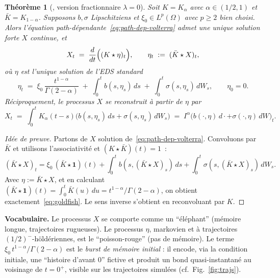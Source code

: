 \documentclass[11pt,a4paper]{article}
\newtheorem{theorem}{Théorème}[section]
\theoremstyle{definition}
\newcommand{\1}{\mathbf{1}}
\begin{document}
\begin{theorem}[{\cite[Thm 3.4]{BCGP23}}, version fractionnaire $\lambda=0$]
\label{thm:bridge}
Soit $K = K_\alpha$ avec $\alpha\in(1/2,1)$ et $\bar K = K_{1-\alpha}$. Supposons
$b,\sigma$ Lipschitziens et $\xi_0\in L^p(\Omega)$ avec $p\geq 2$ bien choisi.
Alors l'équation path-dépendante~\eqref{eq:path-dep-volterra} admet une unique
solution forte $X$ continue, et
\[
X_t \;=\; \frac{d}{dt}\Bigl((K\star \eta)_t\Bigr),\qquad
\eta_t \;:=\; (\bar K \star X)_t,
\]
où $\eta$ est l'unique solution de l'EDS \emph{standard}
\begin{equation}
\boxed{~~\eta_t \;=\; \xi_0\,\frac{t^{1-\alpha}}{\Gamma(2-\alpha)}
       \;+\; \int_0^t b(s,\eta_s)\, ds
       \;+\; \int_0^t \sigma(s,\eta_s)\, dW_s, \qquad \eta_0 = 0.~~}
\label{eq:goldfish}
\end{equation}
Réciproquement, le processus $X$ se reconstruit à partir de $\eta$ par
\begin{equation}
X_t \;=\; \int_0^t K_\alpha(t-s)\bigl(b(s,\eta_s)\,ds + \sigma(s,\eta_s)\,dW_s\bigr)
      \;=\; I^\alpha\bigl(b(\cdot,\eta)\,d\cdot + \sigma(\cdot,\eta)\,dW\bigr)_t.
\label{eq:elephant-recon}
\end{equation}
\end{theorem}

\begin{proof}[Idée de preuve]
Partons de $X$ solution de~\eqref{eq:path-dep-volterra}. Convoluons par $\bar K$
et utilisons l'associativité et $(K\star\bar K)(t)=1$~:
\[
(\bar K \star X)_t = \xi_0\,(\bar K\star \1)(t) + \int_0^t b(s,(\bar K\star X)_s)\,ds
                     + \int_0^t \sigma(s,(\bar K\star X)_s)\,dW_s.
\]
Avec $\eta := \bar K\star X$, et en calculant $(\bar K\star\1)(t) = \int_0^t
\bar K(u)\, du = t^{1-\alpha}/\Gamma(2-\alpha)$, on obtient
exactement~\eqref{eq:goldfish}. Le sens inverse s'obtient en reconvoluant par
$K$.
\end{proof}

\noindent\textbf{Vocabulaire.} Le processus $X$ se comporte comme un
\enquote{éléphant} (mémoire longue, trajectoires rugueuses). Le processus $\eta$,
markovien et à trajectoires $(1/2)^-$-höldériennes, est le \enquote{poisson-rouge}
(pas de mémoire). Le terme $\xi_0\, t^{1-\alpha}/\Gamma(2-\alpha)$ est le
\emph{burst de mémoire initial} : il encode, via la condition initiale, une
\enquote{histoire d'avant $0$} fictive et produit un bond quasi-instantané au
voisinage de $t=0^{+}$, visible sur les trajectoires simulées (cf.\ Fig.~\ref{fig:trajs}).
\end{document}

